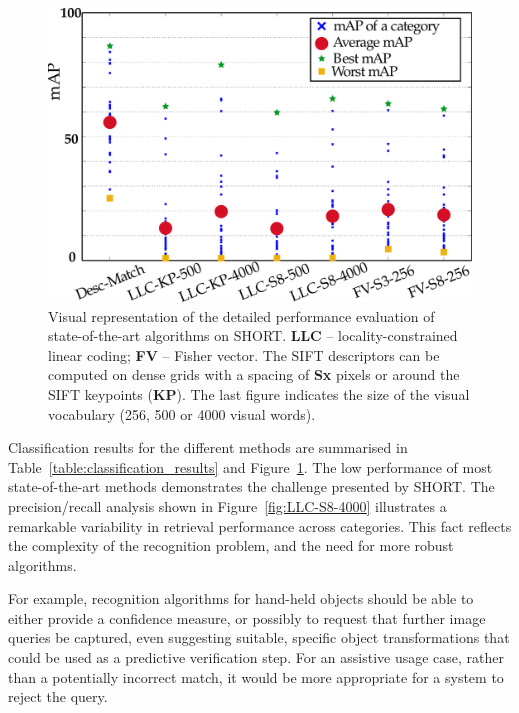 \begin{figure}[]
\begin{center}
\includegraphics[width=\linewidth]{./gfx/Chapter03/methods-v5.pdf}
\caption{Visual representation of the detailed performance evaluation of state-of-the-art algorithms on SHORT. \textbf{LLC} -- locality-constrained linear coding; \textbf{FV} -- Fisher vector. The SIFT descriptors can be computed on dense grids with a spacing of \textbf{Sx} pixels or around the SIFT keypoints (\textbf{KP}). The last figure indicates the size of the visual vocabulary (256, 500 or 4000 visual words).}
\label{fig:methods}
\end{center}
\end{figure}




Classification results for the different methods are summarised in Table~\ref{table:classification_results}  and Figure~\ref{fig:methods}. The low performance of most state-of-the-art methods demonstrates the challenge presented by SHORT. The precision/recall analysis shown in Figure~\ref{fig:LLC-S8-4000} illustrates a remarkable variability in retrieval performance across categories. This fact reflects the complexity of the recognition problem, and the need for more robust algorithms. 

For example, recognition algorithms for hand-held objects should be able to either provide a confidence measure, or possibly to request that further image queries be captured, even suggesting suitable, specific object transformations that could be used as a predictive verification step. For an assistive usage case, rather than a potentially incorrect match, it would be more appropriate for a system to reject the query.


